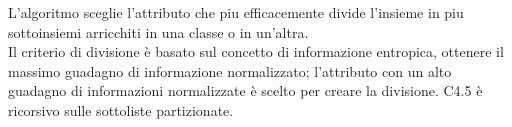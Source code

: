 \documentclass[../tesi.tex]{subfiles}
\begin{document}
L’algoritmo sceglie l’attributo che piu efficacemente divide l’insieme in piu sottoinsiemi arricchiti in una classe o in un’altra.\\
Il criterio di divisione è basato sul concetto di informazione entropica, ottenere il massimo guadagno di informazione normalizzato; l’attributo con un alto guadagno di informazioni normalizzate è scelto per creare la divisione. C4.5 è ricorsivo sulle sottoliste partizionate.
\\
\end{document}
